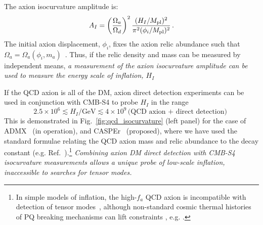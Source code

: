 The axion isocurvature amplitude is:
\begin{equation}
A_I = \left(\frac{\Omega_a}{\Omega_d}\right)^2\frac{(H_I/M_{\rm pl})^2}{\pi^2(\phi_i/M_{\rm pl})^2} \, .
\label{eqn:iso_amplitude}
\end{equation}
The initial axion displacement, $\phi_i$, fixes the axion relic abundance such that $\Omega_a=\Omega_a (\phi_i,m_a)$~\cite{Preskill:1982cy,Abbott:1982af,Dine:1982ah,Turner:1983he,Steinhardt:1983ia,Marsh:2010wq}. Thus, if the relic density and mass can be measured by independent means, \emph{a measurement of the axion isocurvature amplitude can be used to measure the energy scale of inflation, $H_I$}

If the QCD axion is all of the DM, axion direct detection experiments can be used in conjunction with CMB-S4 to probe $H_I$ in the range
\begin{equation}
 2.5\times 10^6\lesssim H_I/\text{GeV}\lesssim 4\times 10^9\, 
\text{(QCD axion + direct detection)}\, \,
\end{equation}
This is demonstrated in Fig.~\ref{fig:qcd_isocurvature} (left panel) for the case of ADMX~\cite{Asztalos:2009yp} (in operation), and CASPEr~\cite{Budker:2013hf} (proposed), where we have used the standard formulae relating the QCD axion mass and relic abundance to the decay constant (e.g. Ref.~\cite{Fox:2004kb}).\footnote{In simple models of inflation, the high-$f_a$ QCD axion is incompatible with detection of tensor modes~\cite{Fox:2004kb,Hertzberg:2008wr,Visinelli:2014twa,Marsh:2014qoa,Visinelli:2014twa}, although non-standard cosmic thermal histories of PQ breaking mechanisms can lift constraints , e.g. \cite{Higaki:2014ooa,Fairbairn:2014zta,Nomura:2015xil}.} \emph{Combining axion DM direct detection with CMB-S4 isocurvature measurements allows a unique probe of low-scale inflation, inaccessible to searches for tensor modes.}

